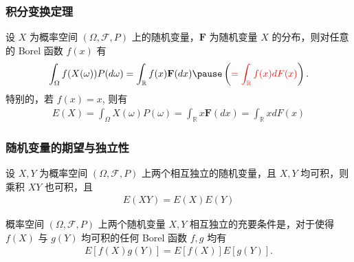 	\begin{frame}
		\frametitle{积分变换定理}
		\begin{thm}
			设 $X$ 为概率空间 $(\Omega,\mathcal{F}, P)$ 上的随机变量，$\mathbf{F}$ 为随机变量 $X$ 的分布，则对任意的 Borel 函数 $f (x)$ 有
			\begin{eqnarray*}
				\int_\Omega f(X(\omega))P(d\omega)= \int_{\mathbb{R}}f(x)\mathbf{F}(dx) \pause \left(\textcolor{red}{= \int_{\mathbb{R}}f(x)dF(x)}\right).
			\end{eqnarray*}
			特别的，若 $f (x)=x$, 则有
			\begin{eqnarray*}
				E(X)=\int_\Omega X(\omega)P(\omega)=\int_{\mathbb{R}}x \mathbf{F}(dx)=\int_{\mathbb{R}} xdF(x)
			\end{eqnarray*}

		\end{thm}
	\end{frame}

	\begin{frame}
		\frametitle{随机变量的期望与独立性}
		\begin{thm}
			设 $X, Y$ 为概率空间 $(\Omega,\mathcal{F}, P)$ 上两个相互独立的随机变量，且 $X, Y$ 均可积，则乘积 $XY$ 也可积，且
			\begin{eqnarray*}
				E(XY)=E(X)E(Y)
			\end{eqnarray*}

		\end{thm}

		\pause
		\begin{thm}
			概率空间 $(\Omega,\mathcal{F}, P)$ 上两个随机变量 $X, Y$ 相互独立的充要条件是，对于使得 $f (X)$ 与 $g (Y)$ 均可积的任何 Borel 函数 $f,g$ 均有
			\begin{eqnarray*}
				E[f(X)g(Y)]=E[f(X)]E[g(Y)].
			\end{eqnarray*}

		\end{thm}



	\end{frame}


